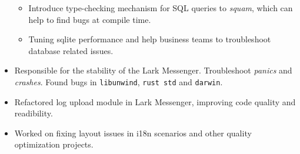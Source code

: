 \documentclass{resume}
\newcommand{\en}[1]{#1}
\newcommand{\zh}[1]{}
\begin{document}
\begin{itemize}
\begin{itemize}
{                        }
                        \zh{
                            为 \textit{squam} 开发了一个异步的 sqlite 连接池，相较于 \texttt{r2d2}，\texttt{squam} 的吞吐量更高。
                        }
                  \item \en{
                            Introduce type-checking mechanism for SQL queries to \textit{squam}, which can help to find bugs at compile time.
                        }
                        \zh{
                            为 \textit{squam} 引入了 SQL 查询的类型检查机制，可以在编译时发现大部分 bug。
                        }
                  \item \en{
                            Tuning sqlite performance and
                            help business teams to troubleshoot database related issues.
                        }
                        \zh{
                            进行 sqlite 调优，协助业务方排查数据库相关的问题。
                        }
            \end{itemize}
      \item \en{
                Responsible for the stability of the Lark Messenger. Troubleshoot \textit{panics} and \textit{crashes}.
                Found bugs in \texttt{libunwind}, \texttt{rust std} and \texttt{darwin}.
            }
            \zh{
                负责飞书客户端的稳定性，定位并修复 \textit{panic} 和 \textit{crash}。
                在定位过程中发现了 \texttt{libunwind}、\texttt{rust std} 和 \texttt{darwin} 等基础库的一些 bug。
            }
      \item \en{
                Refactored log upload module in Lark Messenger, improving code quality and readibility.
            }
            \zh{
                重构了飞书的日志上传模块，提升了代码质量和可读性。
            }
\end{itemize}

\en{}
\zh{\datedsubsection{\textbf{\href{https://www.bytedance.com/}{字节跳动}}}{04/2020 -- 07/2020}}
\en{}
\zh{\role{飞书}{iOS 研发实习}}
\begin{itemize}
      \item \en{Worked on fixing layout issues in i18n scenarios and other quality optimization projects.}
            \zh{主要任务为国际化场景下 iOS 端的布局问题的修复等品质优化相关项目。}
\end{itemize}
\end{document}
